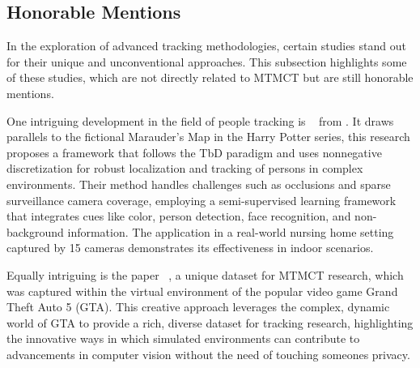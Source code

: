 \subsection{Honorable Mentions}\label{subsec:honorable_mentions}
In the exploration of advanced tracking methodologies, certain studies stand out for their unique and unconventional approaches. This subsection highlights some of these studies, which are not directly related to MTMCT but are still honorable mentions.

One intriguing development in the field of people tracking is ~\cite{Yu13} from \citeyear{Yu13}. It draws parallels to the fictional Marauder's Map in the Harry Potter series, this research proposes a framework that follows the TbD paradigm and uses nonnegative discretization for robust localization and tracking of persons in complex environments. Their method handles challenges such as occlusions and sparse surveillance camera coverage, employing a semi-supervised learning framework that integrates cues like color, person detection, face recognition, and non-background information. The application in a real-world nursing home setting captured by 15 cameras demonstrates its effectiveness in indoor scenarios.

Equally intriguing is the paper ~\cite{Koehl20}, a unique dataset for MTMCT research, which was captured within the virtual environment of the popular video game Grand Theft Auto 5 (GTA). This creative approach leverages the complex, dynamic world of GTA to provide a rich, diverse dataset for tracking research, highlighting the innovative ways in which simulated environments can contribute to advancements in computer vision without the need of touching someones privacy.